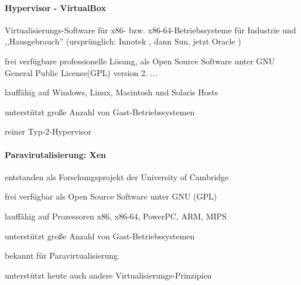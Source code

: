 \documentclass[a4paper]{article}
\begin{document}
\begin{multicols}{3}
    \paragraph{Hypervisor - VirtualBox}
    \begin{itemize*}
        \item Virtualisierungs-Software für x86- bzw. x86-64-Betriebssysteme für Industrie und ,,Hausgebrauch'' (ursprünglich: Innotek , dann Sun, jetzt Oracle )
        \item frei verfügbare professionelle Lösung, als Open Source Software unter GNU General Public License(GPL) version 2. ...
        \item lauffähig auf Windows, Linux, Macintosh und Solaris Hosts
        \item unterstützt große Anzahl von Gast-Betriebssystemen%
        \item reiner Typ-2-Hypervisor
    \end{itemize*}

    \paragraph{Paravirutalisierung: Xen}
    \begin{itemize*}
        \item entstanden als Forschungsprojekt der University of Cambridge
        \item frei verfügbar als Open Source Software unter GNU (GPL)
        \item lauffähig auf Prozessoren x86, x86-64, PowerPC, ARM, MIPS
        \item unterstützt große Anzahl von Gast-Betriebssystemen %
        \item bekannt für Paravirtualisierung
        \item unterstützt heute auch andere Virtualisierungs-Prinzipien
    \end{itemize*}


\end{multicols}
\end{document}
